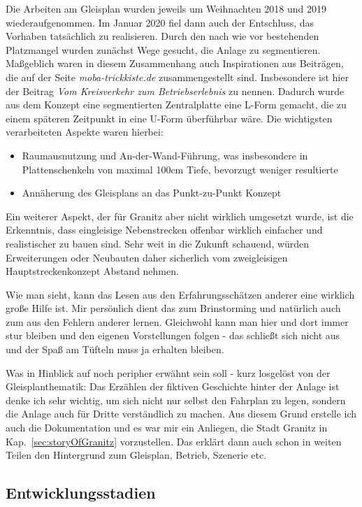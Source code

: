 Die Arbeiten am Gleisplan wurden jeweils um Weihnachten 2018 und 2019 wiederaufgenommen.
Im Januar 2020 fiel dann auch der Entschluss, das Vorhaben tats\"achlich zu realisieren.
Durch den nach wie vor bestehenden Platzmangel wurden zun\"achst Wege gesucht, die Anlage zu segmentieren.
Ma{\ss}geblich waren in diesem Zusammenhang auch Inspirationen aus Beitr\"agen, die auf der Seite \textit{moba-trickkiste.de} zusammengestellt sind.
Insbesondere ist hier der Beitrag \textit{Vom Kreisverkehr zum Betriebserlebnis} \cite{Gee17} zu nennen.
Dadurch wurde aus dem Konzept eine segmentierten Zentralplatte eine L-Form gemacht, die zu einem sp\"ateren Zeitpunkt in eine U-Form \"uberf\"uhrbar w\"are.
Die wichtigsten verarbeiteten Aspekte waren hierbei:
\begin{itemize}
	\item Raumausnutzung und An-der-Wand-F\"uhrung, was insbesondere in Plattenschenkeln von maximal 100cm Tiefe, bevorzugt weniger resultierte
	\item Ann\"aherung des Gleisplans an das Punkt-zu-Punkt Konzept
\end{itemize}
Ein weiterer Aspekt, der f\"ur Granitz aber nicht wirklich umgesetzt wurde, ist die Erkenntnis, dass eingleisige Nebenstrecken offenbar wirklich einfacher und realistischer zu bauen sind.
Sehr weit in die Zukunft schauend, w\"urden Erweiterungen oder Neubauten daher sicherlich vom zweigleisigen Hauptstreckenkonzept Abstand nehmen.

Wie man sieht, kann das Lesen aus den Erfahrungssch\"atzen anderer eine wirklich gro{\ss}e Hilfe ist.
Mir pers\"onlich dient das zum Brinstorming und nat\"urlich auch zum aus den Fehlern anderer lernen.
Gleichwohl kann man hier und dort immer stur bleiben und den eigenen Vorstellungen folgen - das schlie{\ss}t sich nicht aus und der Spa{\ss} am T\"ufteln muss ja erhalten bleiben.

Was in Hinblick auf \cite{Gee17} noch peripher erw\"ahnt sein soll - kurz losgel\"ost von der Gleisplanthematik:
Das Erz\"ahlen der fiktiven Geschichte hinter der Anlage ist denke ich sehr wichtig, um sich nicht nur selbst den Fahrplan zu legen, sondern die Anlage auch f\"ur Dritte verst\"andlich zu machen.
Aus diesem Grund erstelle ich auch die Dokumentation und es war mir ein Anliegen, die Stadt Granitz in Kap.~\ref{sec:storyOfGranitz} vorzustellen.
Das erkl\"art dann auch schon in weiten Teilen den Hintergrund zum Gleisplan, Betrieb, Szenerie etc.


\subsection{Entwicklungsstadien}
\label{sec:map_history}

